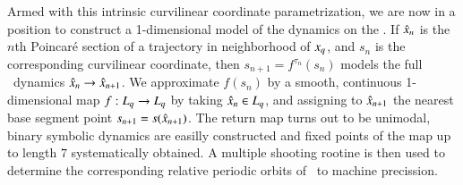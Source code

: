 Armed with this intrinsic curvilinear coordinate
parametrization, we are now in a position to construct a
1-dimensional model of the dynamics on the \nws. If
$\hat{x}_n$ is the $n$th Poincar\'e section of a
trajectory in neighborhood of $x_q$, and $s_n$ is the
corresponding curvilinear coordinate, then $s_{n+1} = f^{\tau_n}(s_n)$
models the full \statesp\ dynamics $\hat{x}_n \to
\hat{x}_{n+1}$. We approximate $f(s_n)$ by a smooth,
continuous 1-dimensional map $f : L_q \to L_q$ by taking
$\hat{x}_n \in L_q$, and assigning to
$\hat{x}_{n+1}$ the nearest base segment point
$s_{n+1}=s(\hat{x}_{n+1})$. The return map turns out to
be unimodal, binary symbolic dynamics are easilly constructed
and fixed points of the map up to length
$7$ systematically obtained. A multiple shooting rootine is then
used to determine the corresponding relative periodic orbits of
\cLe\ to machine precission.


